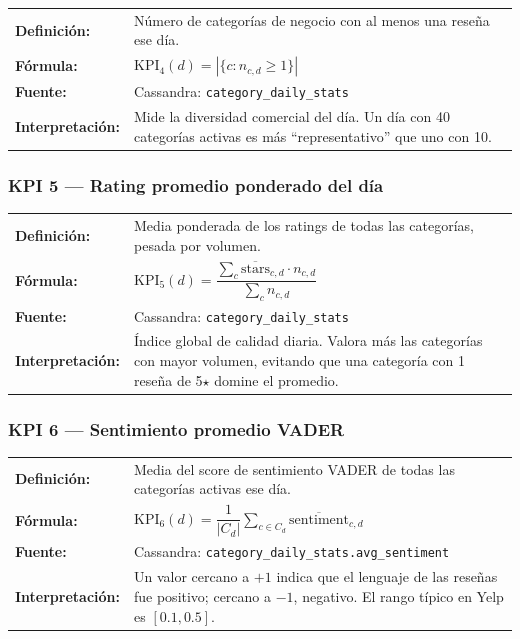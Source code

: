 \documentclass[12pt,a4paper]{article}
\begin{document}
\begin{tabular}{>{\bfseries}l >{\raggedright\arraybackslash}p{10.5cm}}
\textbf{Definición:} & Número de categorías de negocio con al menos una reseña ese día. \\
\textbf{Fórmula:} & $\text{KPI}_4(d) = \left|\{c : n_{c,d} \geq 1\}\right|$ \\
\textbf{Fuente:} & Cassandra: \texttt{category\_daily\_stats} \\
\textbf{Interpretación:} & Mide la diversidad comercial del día. Un día con 40 categorías activas es más ``representativo'' que uno con 10. \\
\end{tabular}

\vspace{0.5em}

\subsubsection{KPI 5 — Rating promedio ponderado del día}

\begin{tabular}{>{\bfseries}l >{\raggedright\arraybackslash}p{10.5cm}}
\textbf{Definición:} & Media ponderada de los ratings de todas las categorías, pesada por volumen. \\
\textbf{Fórmula:} & $\text{KPI}_5(d) = \dfrac{\sum_c \overline{\text{stars}}_{c,d} \cdot n_{c,d}}{\sum_c n_{c,d}}$ \\
\textbf{Fuente:} & Cassandra: \texttt{category\_daily\_stats} \\
\textbf{Interpretación:} & Índice global de calidad diaria. Valora más las categorías con mayor volumen, evitando que una categoría con 1 reseña de 5$\star$ domine el promedio. \\
\end{tabular}

\vspace{0.5em}

\subsubsection{KPI 6 — Sentimiento promedio VADER}

\begin{tabular}{>{\bfseries}l >{\raggedright\arraybackslash}p{10.5cm}}
\textbf{Definición:} & Media del score de sentimiento VADER de todas las categorías activas ese día. \\
\textbf{Fórmula:} & $\text{KPI}_6(d) = \dfrac{1}{|C_d|} \sum_{c \in C_d} \overline{\text{sentiment}}_{c,d}$ \\
\textbf{Fuente:} & Cassandra: \texttt{category\_daily\_stats.avg\_sentiment} \\
\textbf{Interpretación:} & Un valor cercano a $+1$ indica que el lenguaje de las reseñas fue positivo; cercano a $-1$, negativo. El rango típico en Yelp es $[0.1, 0.5]$. \\
\end{tabular}
\end{document}
